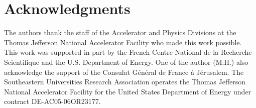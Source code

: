 \section{Acknowledgments}

The authors thank the staff of the Accelerator and Physics Divisions at the 
Thomas Jefferson National Accelerator Facility who made this work 
possible. This work was supported in part by the French Centre National de la 
Recherche Scientifique and the U.S. Department of Energy. One of the 
author (M.H.) also 
acknowledge the support of the Consulat G\'en\'eral de France \`a J\'erusalem. 
The Southeastern Universities Research Association operates the Thomas 
Jefferson National Accelerator Facility for the United States Department of 
Energy under contract DE-AC05-06OR23177.
